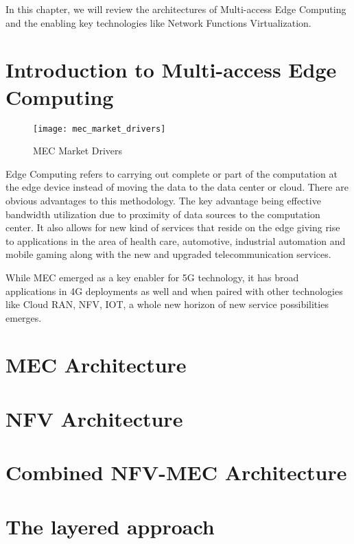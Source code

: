 \documentclass[../seminar.tex]{subfiles}
\begin{document}
In this chapter, we will review the architectures of Multi-access Edge Computing and the enabling key technologies like Network Functions Virtualization.

\section{Introduction to Multi-access Edge Computing}

\begin{figure}
	\centering
	\texttt{[image: mec\_market\_drivers]}
	\label{fig:Figure 2}
	\caption{MEC Market Drivers}
\end{figure}

Edge Computing refers to carrying out complete or part of the computation at the edge device instead of moving the data to the data center or cloud. There are obvious advantages to this methodology. The key advantage being effective bandwidth utilization due to proximity of data sources to the computation center. It also allows for new kind of services that reside on the edge giving rise to applications in the area of health care, automotive, industrial automation and mobile gaming along with the new and upgraded telecommunication services. 

While MEC emerged as a key enabler for 5G technology, it has broad applications in 4G deployments as well and when paired with other technologies like Cloud RAN, NFV, IOT, a whole new horizon of new service possibilities emerges. 


\section{MEC Architecture}



\section{NFV Architecture}



\section{Combined NFV-MEC Architecture}



\section{The layered approach}
\end{document}
